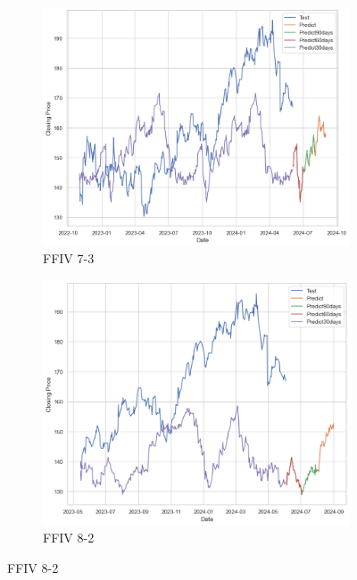 \documentclass{ieeeojies}
\begin{document}
\begin{figure}[H]
    \centering
    \begin{subfigure}[b]{0.33\linewidth}
        \centering
        \includegraphics[width=\linewidth]{ETS Plot/FFIV_ETS_7_3.png}
        \caption{FFIV 7-3}
        \label{fig:ffiv-7-3}
    \end{subfigure}%
    \hfill
    \begin{subfigure}[b]{0.33\linewidth}
        \centering
        \includegraphics[width=\linewidth]{ETS Plot/FFIV_ETS_8_2.png}
        \caption{FFIV 8-2}
        \label{fig:ffiv-8-2}
    \end{subfigure}%

\end{figure}
\end{document}
